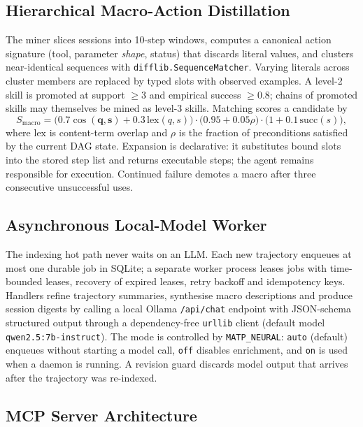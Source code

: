\documentclass[lettersize,journal]{IEEEtran}
\begin{document}
\subsection{Hierarchical Macro-Action Distillation}

The miner slices sessions into 10-step windows, computes a canonical action signature (tool, parameter \emph{shape}, status) that discards literal values, and clusters near-identical sequences with \texttt{difflib.SequenceMatcher}. Varying literals across cluster members are replaced by typed slots with observed examples. A level-2 skill is promoted at support $\geq 3$ and empirical success $\geq 0.8$; chains of promoted skills may themselves be mined as level-3 skills. Matching scores a candidate by
\begin{equation}
\label{eq:macro_match}
S_{\text{macro}} = \bigl(0.7\cos(\mathbf{q}, \mathbf{s}) + 0.3\,\text{lex}(q,s)\bigr) \cdot \bigl(0.95 + 0.05\rho\bigr) \cdot \bigl(1 + 0.1\,\text{succ}(s)\bigr),
\end{equation}
where $\text{lex}$ is content-term overlap and $\rho$ is the fraction of preconditions satisfied by the current DAG state. Expansion is declarative: it substitutes bound slots into the stored step list and returns executable steps; the agent remains responsible for execution. Continued failure demotes a macro after three consecutive unsuccessful uses.

\subsection{Asynchronous Local-Model Worker}

The indexing hot path never waits on an LLM. Each new trajectory enqueues at most one durable job in SQLite; a separate worker process leases jobs with time-bounded leases, recovery of expired leases, retry backoff and idempotency keys. Handlers refine trajectory summaries, synthesise macro descriptions and produce session digests by calling a local Ollama \texttt{/api/chat} endpoint with JSON-schema structured output through a dependency-free \texttt{urllib} client (default model \texttt{qwen2.5:7b-instruct}). The mode is controlled by \texttt{MATP\_NEURAL}: \texttt{auto} (default) enqueues without starting a model call, \texttt{off} disables enrichment, and \texttt{on} is used when a daemon is running. A revision guard discards model output that arrives after the trajectory was re-indexed.

\subsection{MCP Server Architecture}
\end{document}
